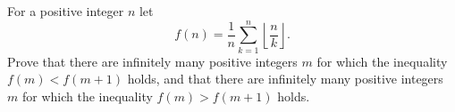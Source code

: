 For a positive integer $n$ let
$$f(n)=\frac{1}{n} \sum_{k=1}^n \left\lfloor \frac{n}{k} \right\rfloor.$$
Prove that there are infinitely many positive integers $m$ for which the
inequality $f(m)<f(m+1)$ holds, and that there are infinitely many positive
integers $m$ for which the inequality $f(m)>f(m+1)$ holds.